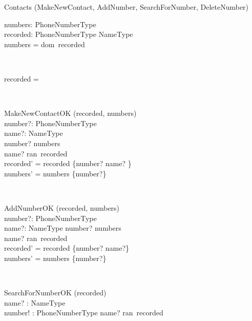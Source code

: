 \begin{class}{Contacts}
\also
\upharpoonright(MakeNewContact, AddNumber, SearchForNumber, DeleteNumber) \\
\begin{state}
numbers:  PhoneNumberType\\
recorded: PhoneNumberType \pfun NameType\\
\where
numbers = dom~recorded
\end{state} \\
\begin{init}
recorded = \emptyset
\end{init} \\
\begin{op}{MakeNewContactOK}
\Delta (recorded, numbers) \\
number?: PhoneNumberType \\
name?: NameType \\
\ST
number? \notin numbers \\
name? \notin ran~recorded \\
recorded' = recorded \cup \{number? \mapsto name? \}\\
numbers' = numbers \cup \{number?\} \\
\end{op}\\
\begin{op}{AddNumberOK}
\Delta (recorded, numbers) \\
number?: PhoneNumberType \\
name?: NameType
\ST
number? \notin numbers \\
name? \in ran~recorded \\
recorded' = recorded \cup \{number? \mapsto name?\} \\
numbers' = numbers \cup \{number?\} \\
\end{op}\\
\begin{op}{SearchForNumberOK}
    \Xi (recorded) \\
    name? : NameType\\
    number! :  PhoneNumberType
    \ST
    name? \in ran~recorded\\

\end{op}
\end{class}
